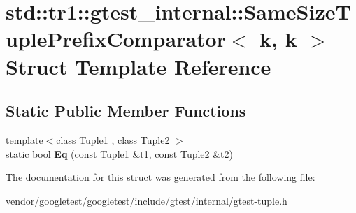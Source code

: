 \hypertarget{structstd_1_1tr1_1_1gtest__internal_1_1SameSizeTuplePrefixComparator_3_01k_00_01k_01_4}{}\section{std\+:\+:tr1\+:\+:gtest\+\_\+internal\+:\+:Same\+Size\+Tuple\+Prefix\+Comparator$<$ k, k $>$ Struct Template Reference}
\label{structstd_1_1tr1_1_1gtest__internal_1_1SameSizeTuplePrefixComparator_3_01k_00_01k_01_4}
\subsection*{Static Public Member Functions}
\begin{DoxyCompactItemize}
\item 
{\footnotesize template$<$class Tuple1 , class Tuple2 $>$ }\\static bool {\bfseries Eq} (const Tuple1 \&t1, const Tuple2 \&t2)\hypertarget{structstd_1_1tr1_1_1gtest__internal_1_1SameSizeTuplePrefixComparator_3_01k_00_01k_01_4_a5564fbade05a2d0522d9899da62c2119}{}\label{structstd_1_1tr1_1_1gtest__internal_1_1SameSizeTuplePrefixComparator_3_01k_00_01k_01_4_a5564fbade05a2d0522d9899da62c2119}

\end{DoxyCompactItemize}


The documentation for this struct was generated from the following file\+:\begin{DoxyCompactItemize}
\item 
vendor/googletest/googletest/include/gtest/internal/gtest-\/tuple.\+h\end{DoxyCompactItemize}
